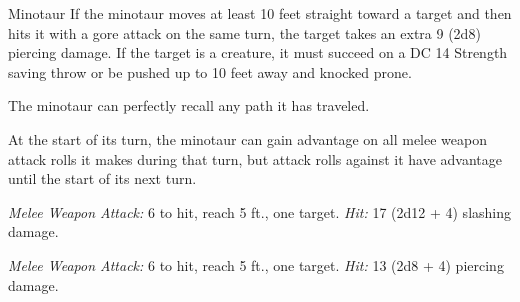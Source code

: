 \documentclass[10pt,a4paper,twoside,bg=print,twocolumn,openany,nodeprecatedcode]{dndbook}
\begin{document}
\begin{DndMonster}[float=t]{Minotaur}
\DndMonsterBasics[
armor-class = {14 (natural armor)},
hit-points = {\DndDice{9d10 + 27}},
speed = {40 ft.}
]
\DndMonsterAbilityScores[
 str = 18,
 dex = 11,
 con = 16,
 int = 6,
 wis = 16,
 cha = 9
]
\DndMonsterDetails[
skills = {Perception +7},
senses = {darkvision 60 ft., passive perception 17},
languages = {Abyssal},
challenge = 3,
]
If the minotaur moves at least 10 feet straight toward a target and then hits it with a gore attack on the same turn, the target takes an extra 9 (2d8) piercing damage. If the target is a creature, it must succeed on a DC 14 Strength saving throw or be pushed up to 10 feet away and knocked prone.

The minotaur can perfectly recall any path it has traveled.

At the start of its turn, the minotaur can gain advantage on all melee weapon attack rolls it makes during that turn, but attack rolls against it have advantage until the start of its next turn.

\textsl{Melee Weapon Attack:} 6 to hit, reach 5 ft., one target. \textsl{Hit:} 17 (2d12 + 4) slashing damage.

\textsl{Melee Weapon Attack:} 6 to hit, reach 5 ft., one target. \textsl{Hit:} 13 (2d8 + 4) piercing damage.

\end{DndMonster}
\end{document}
